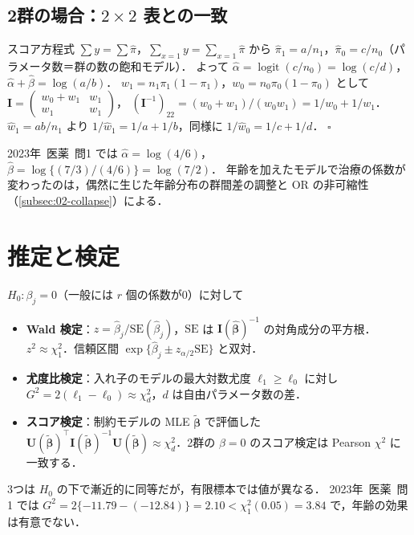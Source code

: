 \documentclass[a4paper,11pt,openany]{ltjsbook}
\newtheorem{meidai}[teigi]{命題}
\newenvironment{proof}[1][証明]{\par\smallskip\noindent{\sffamily\bfseries #1}\quad\ignorespaces}{\nobreak\hfill$\square$\par\medskip}
\newcommand{\kakomon}[2]{\mbox{#1年 医薬 問#2}}
\newcommand{\V}{\mathrm{V}}
\newcommand{\SE}{\mathrm{SE}}
\newcommand{\OR}{\mathrm{OR}}
\newcommand{\logit}{\operatorname{logit}}
\newcommand{\transp}{^{\top}}
\begin{document}
\subsection{2群の場合：\texorpdfstring{$2\times2$}{2×2} 表との一致}\label{subsec:06-2group}
\begin{proof}
スコア方程式 $\sum y=\sum\hat\pi$，$\sum_{x=1}y=\sum_{x=1}\hat\pi$ から $\hat\pi_1=a/n_1$，$\hat\pi_0=c/n_0$（パラメータ数＝群の数の飽和モデル）．
よって $\hat\alpha=\logit(c/n_0)=\log(c/d)$，$\hat\alpha+\hat\beta=\log(a/b)$．
$w_1=n_1\pi_1(1-\pi_1)$，$w_0=n_0\pi_0(1-\pi_0)$ として $\bm I=\begin{pmatrix}w_0+w_1&w_1\\ w_1&w_1\end{pmatrix}$，
$(\bm I^{-1})_{22}=(w_0+w_1)/(w_0w_1)=1/w_0+1/w_1$．$\hat w_1=ab/n_1$ より $1/\hat w_1=1/a+1/b$，同様に $1/\hat w_0=1/c+1/d$．
\end{proof}
\kakomon{2023}{1} では $\hat\alpha=\log(4/6)$，$\hat\beta=\log\{(7/3)/(4/6)\}=\log(7/2)$．
年齢を加えたモデルで治療の係数が変わったのは，偶然に生じた年齢分布の群間差の調整と OR の非可縮性（\cref{subsec:02-collapse}）による．

\section{推定と検定}\label{sec:06-test}
$H_0:\beta_j=0$（一般には $r$ 個の係数が0）に対して
\begin{itemize}
\item \textbf{Wald 検定}：$z=\hat\beta_j/\SE(\hat\beta_j)$，$\SE$ は $\bm I(\hat{\bm\beta})^{-1}$ の対角成分の平方根．$z^2\approx\chi^2_1$．信頼区間 $\exp\{\hat\beta_j\pm z_{\alpha/2}\SE\}$ と双対．
\item \textbf{尤度比検定}：入れ子のモデルの最大対数尤度 $\ell_1\ge\ell_0$ に対し $G^2=2(\ell_1-\ell_0)\approx\chi^2_{d}$，$d$ は自由パラメータ数の差．
\item \textbf{スコア検定}：制約モデルの MLE $\tilde{\bm\beta}$ で評価した $\bm U(\tilde{\bm\beta})\transp\bm I(\tilde{\bm\beta})^{-1}\bm U(\tilde{\bm\beta})\approx\chi^2_d$．2群の $\beta=0$ のスコア検定は Pearson $\chi^2$ に一致する．
\end{itemize}
3つは $H_0$ の下で漸近的に同等だが，有限標本では値が異なる．
\kakomon{2023}{1} では $G^2=2\{-11.79-(-12.84)\}=2.10<\chi^2_1(0.05)=3.84$ で，年齢の効果は有意でない．
\end{document}

